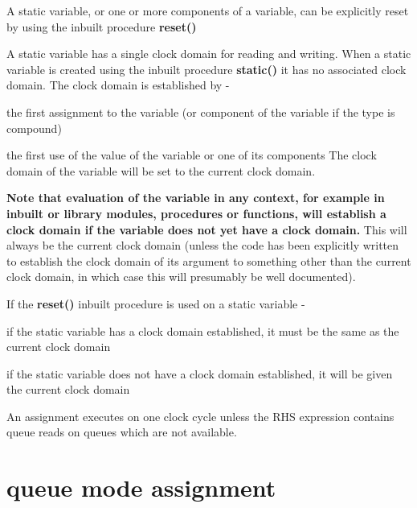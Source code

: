             A static variable, or one or more components of a variable, can be
            explicitly reset by using the inbuilt procedure
            {\bf reset()} 
                              
            A static variable has a single clock domain for reading and
            writing. When a static variable is created using the inbuilt
            procedure {\bf static()}  it has no
            associated clock domain. The clock domain is established by -
            \blist
            \item   the first assignment to the variable (or component of
                    the variable if the type is compound)
            \item   the first use of the value
                    of the variable or one of its components
            \blend
            The clock domain of the variable will be set to the current clock
            domain.

            {\bf Note that evaluation of the variable in any context, for example
            in inbuilt or library modules, procedures or functions, will establish
            a clock domain if the variable does not yet have a clock domain.}
            This will always be the current clock domain (unless the code has
            been explicitly written to establish the clock domain of its argument
            to something other than the current clock domain, in which case
            this will presumably be well documented).

            If the {\bf reset()} inbuilt procedure is used on a static variable -
            \blist
            \item   if the static variable has a clock domain established, it
                    must be the same as the current clock domain
            \item   if the static variable does not have a clock domain established,
                    it will be given the current clock domain
            \blend
            
            An assignment executes on one clock cycle unless the RHS
            expression contains queue reads on queues which are not available.



    \section{queue mode assignment}\label{sec:queue_ass}

